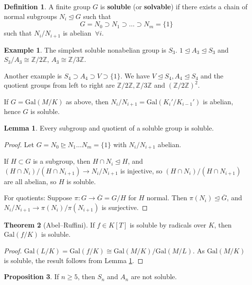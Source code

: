 \documentclass{article}
\theoremstyle{definition}
\newtheorem{theorem}{Theorem}[section]
\newtheorem{lemma}[theorem]{Lemma}
\newtheorem{prop}[theorem]{Proposition}
\newtheorem{example}{Example}[section]
\newtheorem{defn}{Definition}[section]
\begin{document}
\begin{defn}
    A finite group $G$ is \textbf{soluble} (or \textbf{solvable}) if there exists a chain of normal subgroups $N_i \trianglelefteq G$ such that \[
    G = N_0 \supset N_1 \supset \ldots \supset N_m = \{1\}
    \]
    such that $N_i/N_{i+1}$ is abelian $~\forall i$.
\end{defn}
\begin{example}
    The simplest soluble nonabelian group is $S_3$. $1 \trianglelefteq A_3 \trianglelefteq S_3$ and $S_3/A_3 \cong \mathbb{Z}/2\mathbb{Z}$, $A_3 \cong \mathbb{Z}/3\mathbb{Z}$.
    \vspace{1mm}
    
    Another example is $S_4 \supset A_4 \supset V \supset \{1\}$. We have $V \trianglelefteq S_4, A_4 \trianglelefteq S_4$ and the quotient groups from left to right are $\mathbb{Z}/2\mathbb{Z}, \mathbb{Z}/3\mathbb{Z}$ and $(\mathbb{Z}/2\mathbb{Z})^2$.
\end{example}
If $G=\text{Gal}(M/K)$ as above, then $N_i/N_{i+1}= \text{Gal}(K_i'/K_{i-1}')$ is abelian, hence $G$ is soluble.
\begin{lemma}\label{16.3}
    Every subgroup and quotient of a soluble group is soluble.
\end{lemma}    
\begin{proof}
    Let $G=N_0 \trianglerighteq N_1 \ldots N_m = \{1\}$ with $N_i/N_{i+1}$ abelian. \vspace{1mm}
    
    If $H \subset G$ is a subgroup, then $H \cap N_i \trianglelefteq H$, and $(H \cap N_i)/(H \cap N_{i+1}) \to N_i/N_{i+1}$ is injective, so $(H \cap N_i)/(H \cap N_{i+1})$ are all abelian, so $H$ is soluble.
    \vspace{1mm}
    
    For quotients: Suppose $\pi : G \to \overline{G} = G/H$ for $H$ normal. Then $\pi(N_i) \trianglelefteq \overline{G}$, and $N_i/N_{i+1} \to \pi(N_i)/\pi(N_{i+1})$ is surjective.
\end{proof}
\begin{theorem}[Abel--Ruffini]\label{16.4}
    If $f \in K[T]$ is soluble by radicals over $K$, then $\text{Gal}(f/K)$ is soluble.
\end{theorem}
\begin{proof}
    $\text{Gal}(L/K)=\text{Gal}(f/K) \cong \text{Gal}(M/K)/\text{Gal}(M/L)$. As $\text{Gal}(M/K)$ is soluble, the result follows from Lemma \ref{16.3}.
\end{proof}
\begin{prop}
    If $n\ge 5$, then $S_n$ and $A_n$ are not soluble.
\end{prop}
\end{document}
